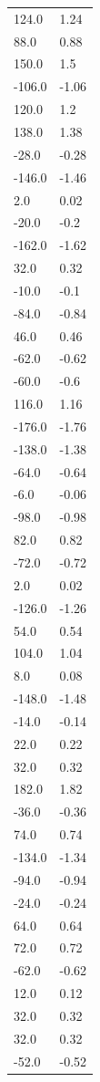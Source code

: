 \begin{longtable}{ll}
124.0 & 1.24 \\
88.0 & 0.88 \\
150.0 & 1.5 \\
-106.0 & -1.06 \\
120.0 & 1.2 \\
138.0 & 1.38 \\
-28.0 & -0.28 \\
-146.0 & -1.46 \\
2.0 & 0.02 \\
-20.0 & -0.2 \\
-162.0 & -1.62 \\
32.0 & 0.32 \\
-10.0 & -0.1 \\
-84.0 & -0.84 \\
46.0 & 0.46 \\
-62.0 & -0.62 \\
-60.0 & -0.6 \\
116.0 & 1.16 \\
-176.0 & -1.76 \\
-138.0 & -1.38 \\
-64.0 & -0.64 \\
-6.0 & -0.06 \\
-98.0 & -0.98 \\
82.0 & 0.82 \\
-72.0 & -0.72 \\
2.0 & 0.02 \\
-126.0 & -1.26 \\
54.0 & 0.54 \\
104.0 & 1.04 \\
8.0 & 0.08 \\
-148.0 & -1.48 \\
-14.0 & -0.14 \\
22.0 & 0.22 \\
32.0 & 0.32 \\
182.0 & 1.82 \\
-36.0 & -0.36 \\
74.0 & 0.74 \\
-134.0 & -1.34 \\
-94.0 & -0.94 \\
-24.0 & -0.24 \\
64.0 & 0.64 \\
72.0 & 0.72 \\
-62.0 & -0.62 \\
12.0 & 0.12 \\
32.0 & 0.32 \\
32.0 & 0.32 \\
-52.0 & -0.52 \\

\end{longtable}
